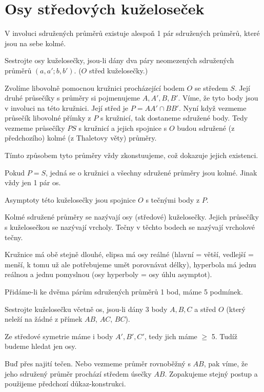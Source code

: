\documentclass[12pt]{article}					%
\begin{document}
\section{Osy středových kuželoseček}
\begin{veta}
	V involuci sdružených průměrů existuje alespoň 1 pár sdružených průměrů, které jsou na sebe kolmé.

	\begin{dukazin}[Konstrukcí]
		Sestrojte osy kuželosečky, jsou-li dány dva páry neomezených sdružených průměrů $(a, a'; b, b')$. ($O$ střed kuželosečky.)

		Zvolíme libovolně pomocnou kružnici procházející bodem $O$ se středem $S$. Její druhé průsečíky s průměry si pojmenujeme $A, A', B, B'$. Víme, že tyto body jsou v involuci na této kružnici. Její střed je $P = AA' \cap BB'$. Nyní když vezmeme průsečík libovolné přímky z $P$ s kružnicí, tak dostaneme sdružené body. Tedy vezmeme průsečíky $PS$ s kružnicí a jejich spojnice s $O$ budou sdružené (z předchozího) kolmé (z Thaletovy věty) průměry.

		Tímto způsobem tyto průměry vždy zkonstuujeme, což dokazuje jejich existenci.
	\end{dukazin}

	\begin{poznamkain}
		Pokud $P = S$, jedná se o kružnici a všechny sdružené průměry jsou kolmé. Jinak vždy jen 1 pár os.

		Asymptoty této kuželosečky jsou spojnice $O$ s tečnými body z $P$.
	\end{poznamkain}
\end{veta}

\begin{definice}
	Kolmé sdružené průměry se nazývají osy (středové) kuželosečky. Jejich průsečíky s kuželosečkou se nazývají vrcholy. Tečny v těchto bodech se nazývají vrcholové tečny.

	\begin{poznamkain}
		Kružnice má obě stejně dlouhé, elipsa má osy reálné (hlavní = větší, vedlejší = menší, k tomu už ale potřebujeme umět porovnávat délky), hyperbola má jednu reálnou a jednu pomyslnou (osy hyperboly = osy úhlu asymptot).

		Přidáme-li ke dvěma párům sdružených průměrů 1 bod, máme 5 podmínek.
	\end{poznamkain}
\end{definice}

\begin{priklad}[Konstrukce]
	Sestrojte kuželosečku včetně os, jsou-li dány 3 body $A, B, C$ a střed $O$ (který neleží na žádné z přímek $AB$, $AC$, $BC$).

	\begin{reseni}
		Ze středové symetrie máme i body $A', B', C'$, tedy jich máme $≥$ 5. Tudíž budeme hledat jen osy.

		Buď přes najití tečen. Nebo vezmeme průměr rovnoběžný s $AB$, pak víme, že jeho sdružený průměr prochází středem úsečky $AB$. Zopakujeme stejný postup a použijeme předchozí důkaz-konstrukci.
	\end{reseni}
\end{priklad}
\end{document}
